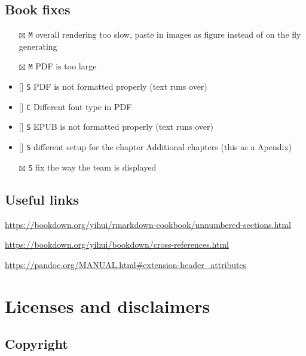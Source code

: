 \documentclass[
]{book}
\newcommand{\passthrough}[1]{#1}
\providecommand{\tightlist}{%
  \setlength{\itemsep}{0pt}\setlength{\parskip}{0pt}}
\begin{document}
\hypertarget{book-fixes}{%
\section{Book fixes}\label{book-fixes}}

\begin{itemize}
\tightlist
\item[$\boxtimes$]
  \passthrough{\lstinline!M!} overall rendering too slow, paste in images as figure instead of on the fly generating
\item[$\boxtimes$]
  \passthrough{\lstinline!M!} PDF is too large
\item
  {[}{]} \passthrough{\lstinline!S!} PDF is not formatted properly (text runs over)
\item
  {[}{]} \passthrough{\lstinline!C!} Different font type in PDF
\item
  {[}{]} \passthrough{\lstinline!S!} EPUB is not formatted properly (text runs over)
\item
  {[}{]} \passthrough{\lstinline!S!} different setup for the chapter Additional chapters (this as a Apendix)
\item[$\boxtimes$]
  \passthrough{\lstinline!S!} fix the way the team is displayed
\end{itemize}

\hypertarget{useful-links}{%
\section{Useful links}\label{useful-links}}

\url{https://bookdown.org/yihui/rmarkdown-cookbook/unnumbered-sections.html}

\url{https://bookdown.org/yihui/bookdown/cross-references.html}

\url{https://pandoc.org/MANUAL.html\#extension-header_attributes}

\hypertarget{license}{%
\chapter{Licenses and disclaimers}\label{license}}

\hypertarget{copyright}{%
\section{Copyright}\label{copyright}}
\end{document}
